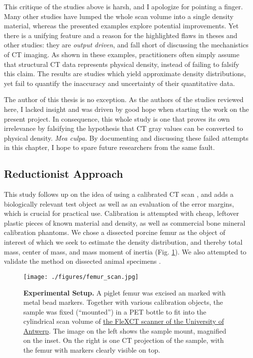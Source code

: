 This critique of the studies above is harsh, and I apologize for pointing a finger.
Many other studies have lumped the whole scan volume into a single density material, whereas the presented examples explore potential improvements.
Yet there is a unifying feature and a reason for the highlighted flaws in theses and other studies: they are \emph{output driven}, and fall short of discussing the mechanistics of CT imaging.
As shown in these examples, practitioners often simply assume that structural CT data represents physical density, instead of failing to falsify this claim.
The results are studies which yield approximate density distributions, yet fail to quantify the inaccuracy and uncertainty of their quantitative data.


The author of this thesis is no exception.
As the authors of the studies reviewed here, I lacked insight and was driven by good hope when starting the work on the present project.
In consequence, this whole study is one that proves its own irrelevance by falsifying the hypothesis that CT gray values can be converted to physical density.
\emph{Mea culpa.}
By documenting and discussing these failed attempts in this chapter, I hope to spare future researchers from the same fault.


\subsection{Reductionist Approach}
\label{sec:org53ebda5}
This study follows up on the idea of using a calibrated CT scan \citep{DuPlessis2013}, and adds a biologically relevant test object as well as an evaluation of the error margins, which is crucial for practical use.
Calibration is attempted with cheap, leftover plastic pieces of known material and density, as well as commercial bone mineral calibration phantoms.
We chose a dissected porcine femur as the object of interest of which we seek to estimate the density distribution, and thereby total mass, center of mass, and mass moment of inertia (Fig. \ref{fig:femur_scan}).
We also attempted to validate the method on dissected animal specimens \citep[as][]{Durston2022}.

\begin{figure}[htbp]
\centering
\texttt{[image: ./figures/femur\_scan.jpg]}
\caption{\label{fig:femur_scan}\textbf{Experimental Setup.} A piglet femur was excised an marked with metal bead markers. Together with various calibration objects, the sample was fixed (``mounted'') in a PET bottle to fit into the cylindrical scan volume of \href{https://www.uantwerpen.be/en/research-groups/vision-lab/x-ray-imaging-resear/flexct}{the FleXCT scanner of the University of Antwerp}. The image on the left shows the sample mount, magnified on the inset. On the right is one CT projection of the sample, with the femur with markers clearly visible on top.}
\end{figure}


